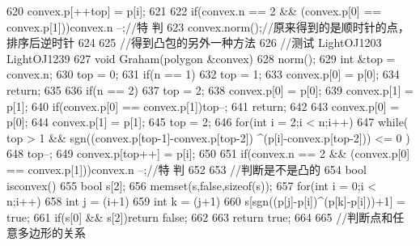 \documentclass[11pt]{article}
\begin{document}
\begin{Code}
{{{620                  convex.p[++top] = p[i];
621              }
622              if(convex.n == 2 && (convex.p[0] == convex.p[1]))convex.n
                    --;//特
                    判
623              convex.norm();//原来得到的是顺时针的点，排序后逆时针
624       }
625       //得到凸包的另外一种方法
626       //测试 LightOJ1203 LightOJ1239
627       void Graham(polygon &convex){
628           norm();
629           int &top = convex.n;
630           top = 0;
631           if(n == 1){
632               top = 1;
633               convex.p[0] = p[0];
634               return;
635           }
636           if(n == 2){
637               top = 2;
638               convex.p[0] = p[0];
639               convex.p[1] = p[1];
640               if(convex.p[0] == convex.p[1])top--;
641               return;
642           }
643           convex.p[0] = p[0];
644           convex.p[1] = p[1];
645           top = 2;
646           for(int i = 2;i < n;i++){
647               while( top > 1 && sgn((convex.p[top-1]-convex.p[top-2])
                     ^(p[i]-convex.p[top-2])) <= 0 )
648                    top--;
649               convex.p[top++] = p[i];
650           }
651           if(convex.n == 2 && (convex.p[0] == convex.p[1]))convex.n
                 --;//特
                 判
652       }
653       //判断是不是凸的
654       bool isconvex(){
655           bool s[2];
656           memset(s,false,sizeof(s));
657           for(int i = 0;i < n;i++){
658               int j = (i+1)%
659               int k = (j+1)%
660               s[sgn((p[j]-p[i])^(p[k]-p[i]))+1] = true;
661               if(s[0] && s[2])return false;
662           }
663           return true;
664       }
665       //判断点和任意多边形的关系


}
\end{Code}
\end{document}
